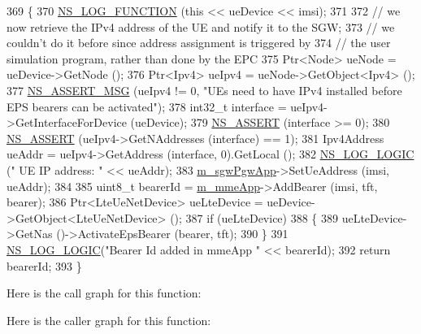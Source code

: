\begin{DoxyCode}
369 \{
370   \hyperlink{log-macros-disabled_8h_a90b90d5bad1f39cb1b64923ea94c0761}{NS\_LOG\_FUNCTION} (\textcolor{keyword}{this} << ueDevice << imsi);
371 
372   \textcolor{comment}{// we now retrieve the IPv4 address of the UE and notify it to the SGW;}
373   \textcolor{comment}{// we couldn't do it before since address assignment is triggered by}
374   \textcolor{comment}{// the user simulation program, rather than done by the EPC   }
375   Ptr<Node> ueNode = ueDevice->GetNode (); 
376   Ptr<Ipv4> ueIpv4 = ueNode->GetObject<Ipv4> ();
377   \hyperlink{assert_8h_aff5ece9066c74e681e74999856f08539}{NS\_ASSERT\_MSG} (ueIpv4 != 0, \textcolor{stringliteral}{"UEs need to have IPv4 installed before EPS bearers can be
       activated"});
378   int32\_t \textcolor{keyword}{interface }=  ueIpv4->GetInterfaceForDevice (ueDevice);
379   \hyperlink{assert_8h_a6dccdb0de9b252f60088ce281c49d052}{NS\_ASSERT} (interface >= 0);
380   \hyperlink{assert_8h_a6dccdb0de9b252f60088ce281c49d052}{NS\_ASSERT} (ueIpv4->GetNAddresses (interface) == 1);
381   Ipv4Address ueAddr = ueIpv4->GetAddress (interface, 0).GetLocal ();
382   \hyperlink{group__logging_ga88acd260151caf2db9c0fc84997f45ce}{NS\_LOG\_LOGIC} (\textcolor{stringliteral}{" UE IP address: "} << ueAddr);  
383   \hyperlink{classns3_1_1PointToPointEpcHelper_ae802bf7daf9022ab6d78333de1ac5a31}{m\_sgwPgwApp}->SetUeAddress (imsi, ueAddr);
384   
385   uint8\_t bearerId = \hyperlink{classns3_1_1PointToPointEpcHelper_a283ac6856b092d9cfa751c04029cbdc3}{m\_mmeApp}->AddBearer (imsi, tft, bearer);
386   Ptr<LteUeNetDevice> ueLteDevice = ueDevice->GetObject<LteUeNetDevice> ();
387   \textcolor{keywordflow}{if} (ueLteDevice)
388     \{
389       ueLteDevice->GetNas ()->ActivateEpsBearer (bearer, tft);
390     \}
391   \hyperlink{group__logging_ga88acd260151caf2db9c0fc84997f45ce}{NS\_LOG\_LOGIC}(\textcolor{stringliteral}{"Bearer Id added in mmeApp "} << bearerId);
392   \textcolor{keywordflow}{return} bearerId;
393 \}
\end{DoxyCode}


Here is the call graph for this function\+:




Here is the caller graph for this function\+:


